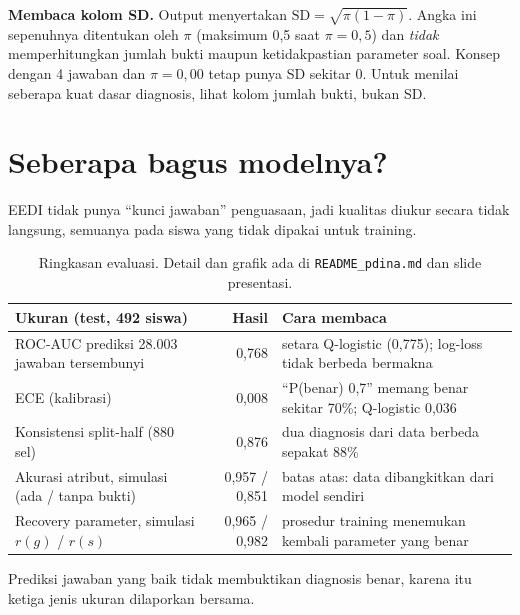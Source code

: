 \documentclass[11pt,a4paper]{article}
\begin{document}
\begin{awas}
  \textbf{Membaca kolom SD.} Output menyertakan $\mathrm{SD}=\sqrt{\pi(1-\pi)}$. Angka ini sepenuhnya ditentukan oleh
  $\pi$ (maksimum 0,5 saat $\pi=0{,}5$) dan \emph{tidak} memperhitungkan jumlah bukti maupun ketidakpastian parameter
  soal. Konsep dengan 4 jawaban dan $\pi=0{,}00$ tetap punya SD sekitar 0. Untuk menilai seberapa kuat dasar
  diagnosis, lihat kolom jumlah bukti, bukan SD.
\end{awas}

\section{Seberapa bagus modelnya?}

EEDI tidak punya ``kunci jawaban'' penguasaan, jadi kualitas diukur secara tidak langsung, semuanya pada siswa yang
tidak dipakai untuk training.

\begin{table}[h]
  \centering\small
  \begin{tabularx}{\linewidth}{@{}L r L@{}}
    \toprule
    Ukuran (test, 492 siswa) & Hasil & Cara membaca \\
    \midrule
    ROC-AUC prediksi 28.003 jawaban tersembunyi & 0,768 & setara Q-logistic (0,775); log-loss tidak berbeda bermakna \\
    ECE (kalibrasi) & 0,008 & ``P(benar) 0,7'' memang benar sekitar 70\%; Q-logistic 0,036 \\
    Konsistensi split-half (880 sel) & 0,876 & dua diagnosis dari data berbeda sepakat 88\% \\
    Akurasi atribut, simulasi (ada / tanpa bukti) & 0,957 / 0,851 & batas atas: data dibangkitkan dari model sendiri \\
    Recovery parameter, simulasi $r(g)$ / $r(s)$ & 0,965 / 0,982 & prosedur training menemukan kembali parameter yang benar \\
    \bottomrule
  \end{tabularx}
  \caption{Ringkasan evaluasi. Detail dan grafik ada di \texttt{README\_pdina.md} dan slide presentasi.}
\end{table}

Prediksi jawaban yang baik tidak membuktikan diagnosis benar, karena itu ketiga jenis ukuran dilaporkan bersama.

\end{document}
